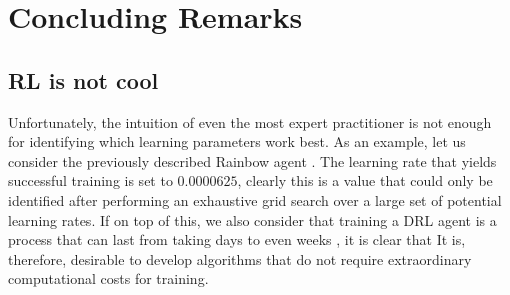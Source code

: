 
\chapter{Concluding Remarks} %
\label{ch:upside_down_rl} %





\section{RL is not cool}
Unfortunately, the intuition of even the most expert practitioner is not enough for identifying which learning parameters work best. As an example, let us consider the previously described Rainbow agent \cite{hessel2018rainbow}. The learning rate that yields successful training is set to $0.0000625$, clearly this is a value that could only be identified after performing an exhaustive grid search over a large set of potential learning rates. If on top of this, we also consider that training a DRL agent is a process that can last from taking days to even weeks \cite{kaiser2019model}, it is clear that  It is, therefore, desirable to develop algorithms that do not require extraordinary computational costs for training.

